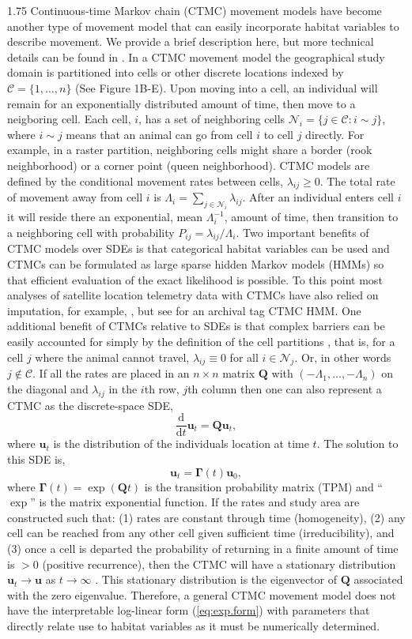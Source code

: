 \documentclass[12pt]{article}
\newcommand{\bQ}{\ensuremath{\mathbf{Q}}}
\newcommand{\bu}{\ensuremath{\mathbf{u}}}
\newcommand{\bG}{\ensuremath{\boldsymbol{\Gamma}}}
\newcommand{\fN}{\ensuremath{\mathcal{N}}}
\newcommand{\fC}{\ensuremath{\mathcal{C}}}
\begin{document}
\begin{spacing}{1.75}
Continuous-time Markov chain (CTMC) movement models have become another type of movement model that can easily incorporate habitat variables to describe movement. We provide a brief description here, but more technical details can be found in \citep{norris1998markov}. In a CTMC movement model the geographical study domain is partitioned into cells or other discrete locations indexed by $\fC = \{1,\dots,n\}$ (See Figure 1B-E). Upon moving into a cell, an individual will remain for an exponentially distributed amount of time, then move to a neigboring cell. Each cell, $i$, has a set of neighboring cells $\fN_i = \{j\in \fC: i \sim j\}$, where $i\sim j$ means that an animal can go from cell $i$ to cell $j$ directly. For example, in a raster partition, neighboring cells might share a border (rook neighborhood) or a corner point (queen neighborhood). CTMC models are defined by the conditional movement rates between cells, $\lambda_{ij} \ge 0$. The total rate of movement away from cell $i$ is $\Lambda_i = \sum_{j\in\fN_i} \lambda_{ij}$. After an individual enters cell $i$ it will reside there an exponential, mean $\Lambda_i^{-1}$, amount of time, then transition to a neighboring cell with probability $P_{ij}=\lambda_{ij}/\Lambda_i$. Two important benefits of CTMC models over SDEs is that categorical habitat variables can be used and CTMCs can be formulated as large sparse hidden Markov models (HMMs) so that efficient evaluation of the exact likelihood is possible. To this point most analyses of satellite location telemetry data with CTMCs have also relied on imputation, for example, \cite{Hanks:2015aa, wilsonestimating, Johnson353516}, but see \cite{pedersen2011estimating} for an archival tag CTMC HMM. One additional benefit of CTMCs relative to SDEs is that complex barriers can be easily accounted for simply by the definition of the cell partitions \citep{wilsonestimating}, that is, for a cell $j$ where the animal cannot travel, $\lambda_{ij}\equiv0$ for all $i \in \fN_j$. Or, in other words $j \notin \fC$. If all the rates are placed in an $n \times n$ matrix $\bQ$ with $(-\Lambda_1,\dots,-\Lambda_n)$ on the diagonal and $\lambda_{ij}$ in the $i$th row, $j$th column then one can also represent a CTMC as the discrete-space SDE,
\[
\frac{\text{d}}{\text{d}t}\bu_t = \bQ\bu_t,
\] 
where $\bu_t$ is the distribution of the individuals location at time $t$. The solution to this SDE is,
\[
\bu_t = \bG(t)\bu_0,
\]
where $\bG(t) = \exp(\bQ t)$ is the transition probability matrix (TPM) and ``$\exp$'' is the matrix exponential function. If the rates and study area are constructed such that: (1) rates are constant through time (homogeneity), (2) any cell can be reached from any other cell given sufficient time (irreducibility), and (3) once a cell is departed the probability of returning in a finite amount of time is $>0$ (positive recurrence), then the CTMC will have a stationary distribution $\bu_t \to \bu$ as $t\to \infty$ \citep{whitehead2013inferring, wilsonestimating}. This stationary distribution is the eigenvector of $\bQ$ associated with the zero eigenvalue. Therefore, a general CTMC movement model does not have the interpretable log-linear form (\ref{eq:exp.form}) with parameters that directly relate use to habitat variables as it must be numerically determined.  


\end{spacing}
\end{document}
